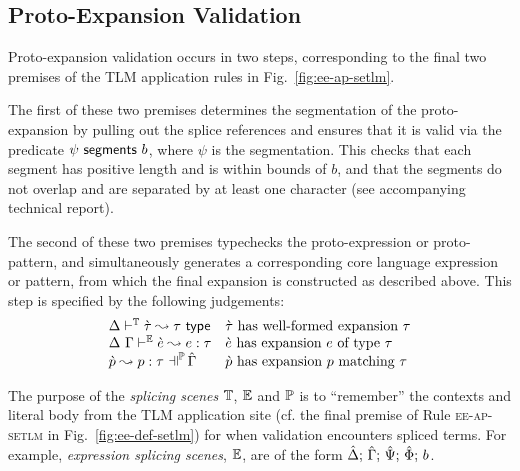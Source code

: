 \documentclass[acmsmall,screen]{acmart}
\begin{document}

\subsection{Proto-Expansion Validation}\label{sec:ce-validation-U}\label{sec:ce-syntax-U}\label{sec:s-PEV}
Proto-expansion validation occurs in two steps, corresponding to the final two premises of the TLM application rules in Fig.~\ref{fig:ee-ap-setlm}. 

The first of these two premises determines the segmentation of the proto-expansion by pulling out the splice references and ensures that it is valid via the predicate $\psi~\mathsf{segments}~b$, where $\psi$ is the segmentation. This checks that each segment  has positive length and is within bounds of $b$, and that the segments do not overlap and are separated by at least one character (see accompanying technical report).

The second of these two premises {typechecks} the proto-expression or proto-pattern, and simultaneously generates a corresponding core language expression or pattern, from which the final expansion is constructed as described above. This step is specified by the following judgements:%
\[\begin{array}{ll}
\cvalidT{\Delta}{\tscenev}{\ctau}{\tau} & \text{$\ctau$ has well-formed expansion $\tau$}\\
\cvalidE{\Delta}{\Gamma}{\escenev}{\ce}{e}{\tau} & \text{$\ce$ has expansion $e$ of type $\tau$}\\
\cvalidP{\upctx}{\pscenev}{\cpv}{p}{\tau} & \text{$\cpv$ has expansion $p$ matching $\tau$}
\end{array}\]



The purpose of the \emph{splicing scenes} $\mathbb{T}$, $\mathbb{E}$ and $\mathbb{P}$ is to ``remember'' the contexts and literal body from the TLM application site (cf. the final premise of Rule \textsc{ee-ap-setlm} in Fig.~\ref{fig:ee-def-setlm}) for when validation encounters spliced terms. For example, \emph{expression splicing scenes}, $\mathbb{E}$, are of the form $\hat{\Delta};\,\hat{\Gamma};\,\hat{\Psi};\,\hat\Phi;\,b$.
\end{document}
